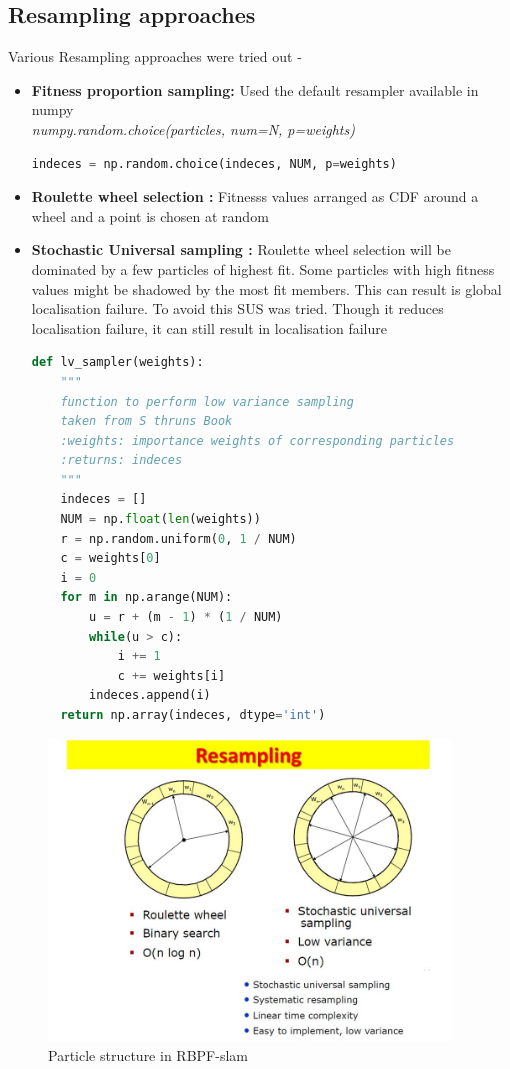 \documentclass{article}
\begin{document}
\subsection{Resampling approaches}
    Various Resampling approaches were tried out -
    \begin{itemize}
        \item \textbf{Fitness proportion sampling:} Used the default resampler available in numpy \\
            \textit{numpy.random.choice(particles, num=N, p=weights)}
            \begin{lstlisting}[language=Python]
            indeces = np.random.choice(indeces, NUM, p=weights)
            \end{lstlisting}
        \item \textbf{Roulette wheel selection :} Fitnesss values arranged as CDF around a wheel and a point is chosen at random
        \item \textbf{Stochastic Universal sampling :} Roulette wheel selection will be dominated by a few particles of highest fit. Some particles with high fitness values might be shadowed by the most fit members. This can result is global localisation failure. To avoid this SUS was tried. Though it reduces localisation failure, it can still result in localisation failure  
            \begin{lstlisting}[language=Python]
def lv_sampler(weights):
    """ 
    function to perform low variance sampling 
    taken from S thruns Book
    :weights: importance weights of corresponding particles
    :returns: indeces 
    """
    indeces = []
    NUM = np.float(len(weights))
    r = np.random.uniform(0, 1 / NUM)
    c = weights[0]
    i = 0
    for m in np.arange(NUM):
        u = r + (m - 1) * (1 / NUM)
        while(u > c):
            i += 1
            c += weights[i]
        indeces.append(i)
    return np.array(indeces, dtype='int')


            \end{lstlisting}
    \end{itemize}

    \begin{figure}
        \includegraphics[height = 80mm]{./rl_multi.jpg}
        \caption{Particle structure in RBPF-slam}
    \end{figure}
\end{document}
